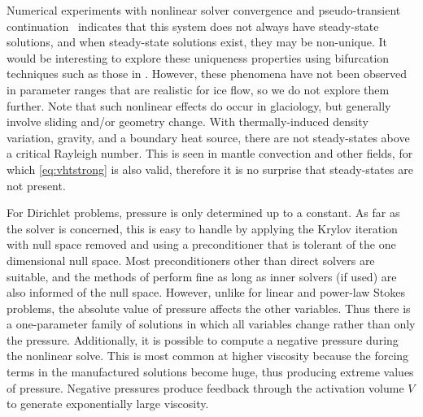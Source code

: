 Numerical experiments with nonlinear solver convergence and pseudo-transient continuation~\citep{coffey2003ptc,kelley1998cap} indicates that this system does not always have steady-state solutions, and when steady-state solutions exist, they may be non-unique.
It would be interesting to explore these uniqueness properties using bifurcation techniques such as those in \citet{allgower2003inc}.
However, these phenomena have not been observed in parameter ranges that are realistic for ice flow, so we do not explore them further.
Note that such nonlinear effects do occur in glaciology, but generally involve sliding and/or geometry change.
With thermally-induced density variation, gravity, and a boundary heat source, there are not steady-states above a critical Rayleigh number.
This is seen in mantle convection and other fields, for which \eqref{eq:vhtstrong} is also valid, therefore it is no surprise that steady-states are not present.

For Dirichlet problems, pressure is only determined up to a constant.
As far as the solver is concerned, this is easy to handle by applying the Krylov iteration with null space removed and using a preconditioner that is tolerant of the one dimensional null space.
Most preconditioners other than direct solvers are suitable, and the methods of  perform fine as long as inner solvers (if used) are also informed of the null space.
However, unlike for linear and power-law Stokes problems, the absolute value of pressure affects the other variables.
Thus there is a one-parameter family of solutions in which all variables change rather than only the pressure.
Additionally, it is possible to compute a negative pressure during the nonlinear solve.
This is most common at higher viscosity because the forcing terms in the manufactured solutions become huge, thus producing extreme values of pressure.
Negative pressures produce feedback through the activation volume $V$ to generate exponentially large viscosity.
